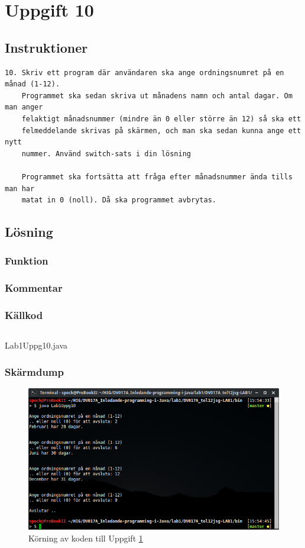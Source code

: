 \section{Uppgift 10}\label{uppgift-10}

\subsection{Instruktioner}
\begin{verbatim}
10. Skriv ett program där användaren ska ange ordningsnumret på en månad (1-12).
    Programmet ska sedan skriva ut månadens namn och antal dagar. Om man anger
    felaktigt månadsnummer (mindre än 0 eller större än 12) så ska ett
    felmeddelande skrivas på skärmen, och man ska sedan kunna ange ett nytt
    nummer. Använd switch-sats i din lösning

    Programmet ska fortsätta att fråga efter månadsnummer ända tills man har
    matat in 0 (noll). Då ska programmet avbrytas.
\end{verbatim}


\subsection{Lösning}
\subsubsection{Funktion}
\subsubsection{Kommentar}

\subsubsection{Källkod}\label{uppgift-10_src}
    \inputminted[linenos]{java}{src/Lab1Uppg10.java}
    \caption{Lab1Uppg10.java}
    \label{Uppg10src}

\subsubsection{Skärmdump}
\begin{figure}[htbp]
    \centering
        \includegraphics[width=\linewidth]{img/10.png}
    \caption{Körning av koden till Uppgift \ref{uppgift-10}}
    \label{fig:screenshot-10}
\end{figure}
